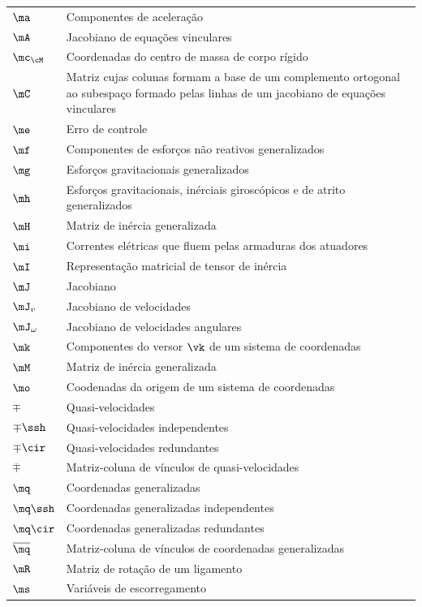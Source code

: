 \documentclass[]{politex}
\begin{document}
\begin{longtable}{lp{}}
  $\ma$ & Componentes de aceleração \\
  $\mA$ & Jacobiano de equações vinculares \\
  $\mc_{\cM}$ & Coordenadas do centro de massa de corpo rígido \\
  $\mC$ & Matriz cujas colunas formam a base de um complemento ortogonal ao subespaço formado pelas linhas de um jacobiano de equações vinculares  \\
  $\me$ & Erro de controle \\
  $\mf$ & Componentes de esforços não reativos generalizados \\
  $\mg$ & Esforços gravitacionais generalizados \\
  $\mh$ & Esforços gravitacionais, inérciais giroscópicos e de atrito generalizados \\
  $\mH$ & Matriz de inércia generalizada \\
  $\mi$ & Correntes elétricas que fluem pelas armaduras dos atuadores \\ 
  $\mI$ & Representação matricial de tensor de inércia \\
  $\mJ$ & Jacobiano \\
  $\mJ_v$ & Jacobiano de velocidades \\
  $\mJ_\omega$ & Jacobiano de velocidades angulares \\
  $\mk$ & Componentes do versor $\vk$ de um sistema de coordenadas \\
  $\mM$ & Matriz de inércia generalizada \\
  $\mo$ & Coodenadas da origem de um sistema de coordenadas \\
  $\mp$ & Quasi-velocidades \\
  $\mp\ssh$ & Quasi-velocidades independentes \\
  $\mp\cir$ & Quasi-velocidades redundantes \\
  $\overline{\mp}$ & Matriz-coluna de vínculos de quasi-velocidades \\
  $\mq$ & Coordenadas generalizadas \\
  $\mq\ssh$ & Coordenadas generalizadas independentes \\
  $\mq\cir$ & Coordenadas generalizadas redundantes \\
  $\overline{\mq}$ & Matriz-coluna de vínculos de coordenadas generalizadas \\
  $\mR$ & Matriz de rotação de um ligamento \\
  $\ms$ & Variáveis de escorregamento \\

\end{longtable}
\end{document}
